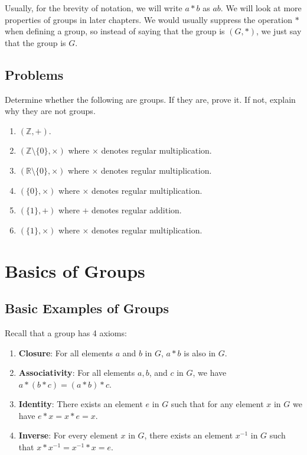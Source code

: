 Usually, for the brevity of notation, we will write $a \ast b$ as $ab$. We will look at more properties of groups in later chapters. We would usually suppress the operation $\ast$ when defining a group, so instead of saying that the group is $(G, \ast)$, we just say that the group is $G$.

\newpage

\section{Problems}
\begin{problem}
Determine whether the following are groups. If they are, prove it. If not, explain why they are not groups.
\begin{enumerate}[label=(\alph*)]
    \item $(\mathbb{Z}, +)$.
    \item $(\mathbb{Z} \setminus \{0\}, \times)$ where $\times$ denotes regular multiplication.
    \item $(\mathbb{R} \setminus \{0\}, \times)$ where $\times$ denotes regular multiplication.
    \item $(\{0\}, \times)$ where $\times$ denotes regular multiplication.
    \item $(\{1\}, +)$ where $+$ denotes regular addition.
    \item $(\{1\}, \times)$ where $\times$ denotes regular multiplication.
\end{enumerate}
\end{problem}
\chapter{Basics of Groups}
\section{Basic Examples of Groups}
Recall that a group has 4 axioms:
\begin{enumerate}
    \item \textbf{Closure}: For all elements $a$ and $b$ in $G$, $a \ast b$ is also in $G$.
    \item \textbf{Associativity}: For all elements $a, b$, and $c$ in $G$, we have $a \ast (b \ast c) = (a \ast b) \ast c$.
    \item \textbf{Identity}: There exists an element $e$ in $G$ such that for any element $x$ in $G$ we have $e \ast x = x \ast e = x$.
    \item \textbf{Inverse}: For every element $x$ in $G$, there exists an element $x^{-1}$ in $G$ such that $x \ast x^{-1} = x^{-1} \ast x = e$.
\end{enumerate}

